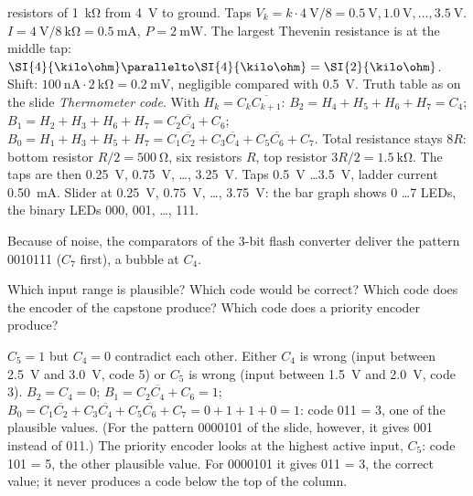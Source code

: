 \begin{solution}
\begin{talist}
 resistors of \SI{1}{\kilo\ohm} from \SI{4}{\volt} to ground. Taps
	$V_k = k\cdot\SI{4}{\volt}/8 = \SI{0.5}{\volt}, \SI{1.0}{\volt}, \ldots, \SI{3.5}{\volt}$.
	$I = \SI{4}{\volt}/\SI{8}{\kilo\ohm} = \SI{0.5}{\milli\ampere}$, $P = \SI{2}{\milli\watt}$.
\ta The largest Thevenin resistance is at the middle tap: $\SI{4}{\kilo\ohm}\parallelto\SI{4}{\kilo\ohm}
	= \SI{2}{\kilo\ohm}$. Shift: $\SI{100}{\nano\ampere}\cdot\SI{2}{\kilo\ohm} = \SI{0.2}{\milli\volt}$,
	negligible compared with \SI{0.5}{\volt}.
\ta Truth table as on the slide \emph{Thermometer code}. With $H_k = C_k\overline{C_{k+1}}$:
	$B_2 = H_4+H_5+H_6+H_7 = C_4$; $B_1 = H_2+H_3+H_6+H_7 = C_2\overline{C_4} + C_6$;
	$B_0 = H_1+H_3+H_5+H_7 = C_1\overline{C_2} + C_3\overline{C_4} + C_5\overline{C_6} + C_7$.
\ta Total resistance stays $8R$: bottom resistor $R/2 = \SI{500}{\ohm}$, six resistors $R$, top
	resistor $3R/2 = \SI{1.5}{\kilo\ohm}$. The taps are then \SI{0.25}{\volt}, \SI{0.75}{\volt}, \ldots, \SI{3.25}{\volt}.
\ta {}\newline Taps \SI{0.5}{\volt} \ldots \SI{3.5}{\volt}, ladder current
	\SI{0.50}{\milli\ampere}. Slider at \SI{0.25}{\volt}, \SI{0.75}{\volt}, \ldots, \SI{3.75}{\volt}:
	the bar graph shows 0 \ldots 7 LEDs, the binary LEDs 000, 001, \ldots, 111.
\end{talist}
\end{solution}

Because of noise, the comparators of the 3-bit flash converter deliver the
pattern 0010111 ($C_7$ first), a bubble at $C_4$.
\begin{talist}
\ta Which input range is plausible? Which code would be correct?
\ta Which code does the encoder of the capstone produce?
\ta Which code does a priority encoder produce?
\end{talist}

\begin{solution}
\begin{talist}
\ta $C_5 = 1$ but $C_4 = 0$ contradict each other. Either $C_4$ is wrong (input
	between \SI{2.5}{\volt} and \SI{3.0}{\volt}, code 5) or $C_5$ is wrong (input between
	\SI{1.5}{\volt} and \SI{2.0}{\volt}, code 3).
\ta $B_2 = C_4 = 0$; $B_1 = C_2\overline{C_4} + C_6 = 1$; $B_0 = C_1\overline{C_2} + C_3\overline{C_4} +
	C_5\overline{C_6} + C_7 = 0+1+1+0 = 1$: code 011 = 3, one of the plausible values. (For the pattern 0000101 of the slide,
	however, it gives 001 instead of 011.)
\ta The priority encoder looks at the highest active input, $C_5$: code 101 = 5, the other
	plausible value. For 0000101 it gives 011 = 3, the correct value; it never produces a code
	below the top of the column.
\end{talist}
\end{solution}

